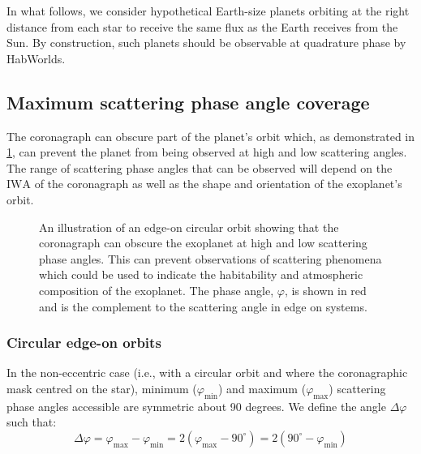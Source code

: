 \documentclass[
    usenatbib,
]{mnras}
\newcommand{\timmy}[1]{\textcolor{red}{[\textbf{Timmy:} #1]}} %
\newcommand{\IWA}{\ensuremath{\mathrm{IWA}}}
\begin{document}
In what follows, we consider hypothetical Earth-size planets orbiting at the right distance from each star to receive the same flux as the Earth receives from the Sun.
%
By construction, such planets should be observable at quadrature phase by HabWorlds. 


\subsection{Maximum scattering phase angle coverage}
\label{sec:Delta_phi}

The coronagraph can obscure part of the planet's orbit which, as demonstrated in \cref{fig:annotated-orbit}, can prevent the planet from being observed at high and low scattering angles. 
%
The range of scattering phase angles that can be observed will depend on the \IWA{} of the coronagraph as well as the shape and orientation of the exoplanet's orbit.

\begin{figure}
    \centering
    
    \caption{
        An illustration of an edge-on circular orbit showing that the coronagraph can obscure the exoplanet at high and low scattering phase angles.
        This can prevent observations of scattering phenomena which could be used to indicate the habitability and atmospheric composition of the exoplanet. The phase angle, $\varphi$, is shown in red and is the complement to the scattering angle in edge on systems.
    }
    \label{fig:annotated-orbit}
\end{figure}


\subsubsection{Circular edge-on orbits}


In the non-eccentric case (i.e., with a circular orbit and where the coronagraphic mask centred on the star), minimum ($\varphi_\mathrm{min}$) and maximum ($\varphi_\mathrm{max}$) scattering phase angles accessible are symmetric about 90 degrees. 
%
We define the angle $\Delta \varphi$ such that: 
\begin{equation}
 \label{eq:Delta_phi}
    \Delta \varphi 
    = \varphi_\mathrm{max} - \varphi_\mathrm{min}
    =  2(\varphi_\mathrm{max} - 90^\circ) 
    =  2(90^\circ-\varphi_\mathrm{min} ) 
\end{equation} 
\end{document}
